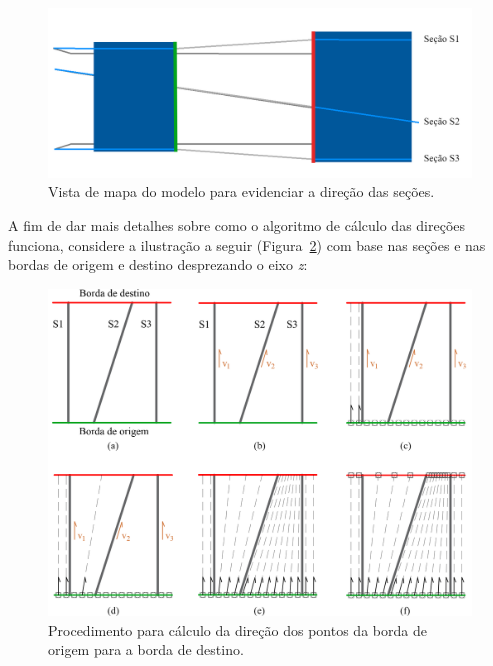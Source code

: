 \begin{figure} [H]
  \begin{center}
    \includegraphics[width=350pt]{images/fig-select-borders-3}
    \caption{Vista de mapa do modelo para evidenciar a direção das seções.}\label{fig-select-borders-3}
  \end{center}
\end{figure}

A fim de dar mais detalhes sobre como o algoritmo de cálculo das direções funciona, considere a ilustração a seguir (Figura~\ref{fig-select-borders-4}) com base nas seções e nas bordas de origem e destino desprezando o eixo \textit{z}:

\begin{figure} [H]
  \begin{center}
    \includegraphics[width=370pt]{images/fig-select-borders-4}
    \caption{Procedimento para cálculo da direção dos pontos da borda de origem para a borda de destino.}\label{fig-select-borders-4}
  \end{center}
\end{figure}


